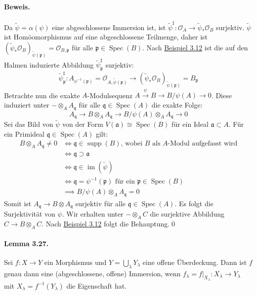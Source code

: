 \paragraph{Beweis.} Da $\tilde{\psi}=\alpha(\psi)$ eine abgeschlossene Immersion ist, ist $\tilde{\psi}^\sharp:\mathcal{O}_A\to\tilde{\psi}_\ast\mathcal{O}_B$ surjektiv. $\tilde{\psi}$ ist Homöomorphismus auf eine abgeschlossene Teilmenge, daher ist $(\tilde{\psi}_\ast\mathcal{O}_B)_{\tilde{\psi}(\mathfrak{p})}=\mathcal{O}_{B,\mathfrak{p}}$ für alle $\mathfrak{p}\in\operatorname{Spec}(B)$. Nach \hyperref[3.12]{Beispiel 3.12} ist die auf den Halmen induzierte Abbildung $\tilde{\psi}^\sharp_\mathfrak{p}$ surjektiv:
\[\tilde{\psi}^\sharp_\mathfrak{p} : A_{\psi^{-1}(\mathfrak{p})}=\mathcal{O}_{A,\tilde{\psi}(\mathfrak{p})}\to (\tilde{\psi}_\ast\mathcal{O}_B)_{\tilde{\psi}(\mathfrak{p})}=B_\mathfrak{p} \]
Betrachte nun die exakte $A$-Modulsequenz $A\stackrel{\psi}{\to}B\to B/\psi(A)\to 0$. Diese induziert unter $-\otimes_AA_\mathfrak{q}$ für alle $\mathfrak{q}\in\operatorname{Spec}(A)$ die exakte Folge:
\[A_\mathfrak{q}\to B\otimes_A A_\mathfrak{q}\to B/\psi(A)\otimes_A A_\mathfrak{q}\to 0 \]
Sei das Bild von $\tilde{\psi}$ von der Form $V(\mathfrak{a})\cong\operatorname{Spec}(B)$ für ein Ideal $\mathfrak{a}\subset A$. Für ein Primideal $\mathfrak{q}\in\operatorname{Spec}(A)$ gilt:
\begin{align*}
B\otimes_A A_\mathfrak{q}\neq 0 &\iff \mathfrak{q}\in\operatorname{supp}(B)\text{, wobei $B$ als $A$-Modul aufgefasst wird}\\
&\iff \mathfrak{q}\supset\mathfrak{a}\\
&\iff \mathfrak{q}\in\operatorname{im}(\tilde{\psi})\\
&\iff\mathfrak{q}=\psi^{-1}(\mathfrak{p})\text{ für ein }\mathfrak{p}\in\operatorname{Spec}(B)\\
&\implies B/\psi(A)\otimes_AA_\mathfrak{q}=0
\end{align*}
Somit ist $A_\mathfrak{q}\to B\otimes A_\mathfrak{q}$ surjektiv für alle $\mathfrak{q}\in\operatorname{Spec}(A)$. Es folgt die Surjektivität von $\psi$. Wir erhalten unter $-\otimes_AC$ die surjektive Abbildung $C\to B\otimes_AC$. Nach \hyperref[3.12]{Beispiel 3.12} folgt die Behauptung.\qed

\paragraph{Lemma 3.27.}\label{3.27} Sei $f:X\to Y$ ein Morphismus und $Y=\bigcup_\lambda Y_\lambda$ eine offene Überdeckung. Dann ist $f$ genau dann eine (abgeschlossene, offene) Immersion, wenn $f_\lambda=f|_{X_\lambda}:X_\lambda \to Y_\lambda$ mit $X_\lambda=f^{-1}(Y_\lambda)$ die Eigenschaft hat.


